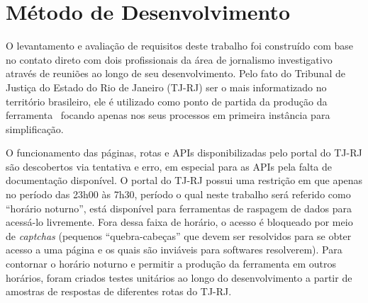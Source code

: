\section{Método de Desenvolvimento}

O levantamento e avaliação de requisitos deste trabalho foi construído com base
no contato direto com dois profissionais da área de jornalismo investigativo
através de reuniões ao longo de seu desenvolvimento. Pelo fato do Tribunal de
Justiça do Estado do Rio de Janeiro (TJ-RJ) ser o mais informatizado no
território brasileiro, ele é utilizado como ponto de partida da produção da
ferramenta \tjscraper~focando apenas nos seus processos em primeira instância
para simplificação.

O funcionamento das páginas, rotas e APIs disponibilizadas pelo portal do TJ-RJ
são descobertos via tentativa e erro, em especial para as APIs pela falta de
documentação disponível. O portal do TJ-RJ possui uma restrição em que apenas
no período das 23h00 às 7h30, período o qual neste trabalho será referido como
``horário noturno'', está disponível para ferramentas de raspagem de dados para
acessá-lo livremente. Fora dessa faixa de horário, o acesso é bloqueado por
meio de \textit{captchas} (pequenos ``quebra-cabeças'' que devem ser resolvidos
para se obter acesso a uma página e os quais são inviáveis para softwares
resolverem). Para contornar o horário noturno e permitir a produção da
ferramenta em outros horários, foram criados testes unitários ao longo do
desenvolvimento a partir de amostras de respostas de diferentes rotas do TJ-RJ.
